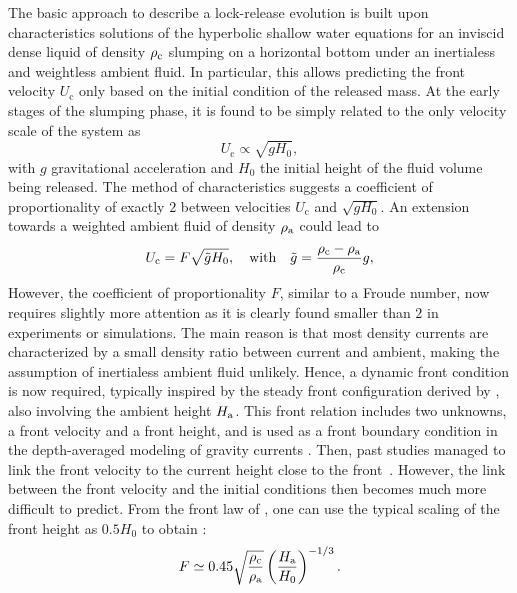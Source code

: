 \documentclass[12pt]{article}
\begin{document}
The basic approach to describe a lock-release evolution is built upon characteristics solutions of the hyperbolic shallow water equations for an inviscid dense liquid of density $\rho_{\text c}$ slumping on a horizontal bottom under an inertialess and weightless ambient fluid. In particular, this allows predicting the front velocity $U_{\text{c}}$ only based on the initial condition of the released mass. At the early stages of the slumping phase, it is found to be simply related to the only velocity scale of the system as
\begin{equation}
	U_{\text{c}}\propto \sqrt{gH_0},
\end{equation}
with $g$ gravitational acceleration and $H_0$ the initial height of the fluid volume being released. The method of characteristics suggests a coefficient of proportionality of exactly $2$ between velocities $U_{\text{c}}$ and $\sqrt{g H_0}$. An extension towards a weighted ambient fluid of density $\rho_{\text a}$ could lead to
\begin{equation}
	\label{eq:solUc}
	U_{\text{c}}=F\sqrt{\tilde{g}H_0},\quad\mbox{with}\quad \tilde{g}=\frac{\rho_{\text c}-\rho_{\text a}}{\rho_{\text c}}g,
\end{equation}
However, the coefficient of proportionality $F$, similar to a Froude number, now requires slightly more attention as it is clearly found smaller than $2$ in experiments or simulations. The main reason is that most density currents are characterized by a small density ratio between current and ambient, making the assumption of inertialess ambient fluid unlikely. 
%
Hence, a dynamic front condition is now required, typically inspired by the steady front configuration derived by \citet{Benjamin1968}, also involving the ambient height $H_{\text a}$. This front relation includes two unknowns, a front velocity and a front height, and is used as a front boundary condition in the depth-averaged modeling of gravity currents \cite[e.g.][]{ungarish2020gravity}. Then, past studies managed to link the front velocity to the current height close to the front~\citep[e.g.][]{Benjamin1968, Huppert1980, Rottman1983, Ungarish2005}. However, the link between the front velocity and the initial conditions then becomes much more difficult to predict. From the front law of \citet{Huppert1980}, one can use the typical scaling of the front height as $0.5 H_{0}$ to obtain :
\begin{equation}
	\label{eq:Froude_Huppert1980}
	F \simeq 0.45 \sqrt{\frac{\rho_{\text c}}{\rho_{\text a}}}\left(\frac{H_{\text a}}{H_0}\right)^{-1/3}.
\end{equation}
\end{document}
